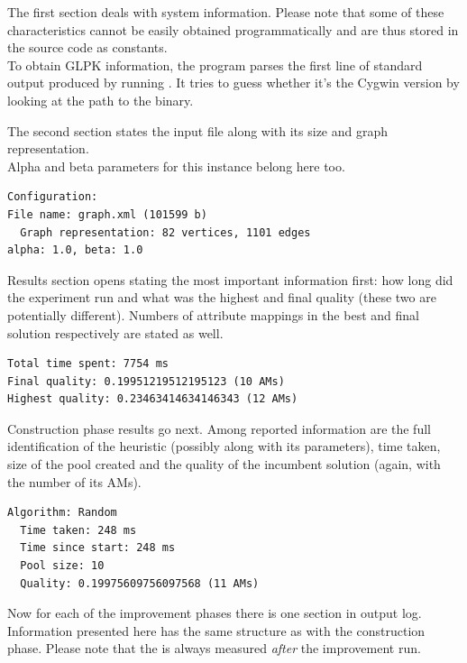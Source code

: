 \documentclass[a4paper,12pt,oneside]{report}
\newcommand{\code}[1]{\texttt{\StrSubstitute{#1}{.}{.\.}}}
\def\.{\discretionary{}{}{}}
\begin{document}
The first section deals with system information. Please note that some of these characteristics cannot be easily obtained programmatically and are thus stored in the source code as constants.\\
To obtain GLPK information, the program parses the first line of standard output produced by running \code{glpsol -v}. It tries to guess whether it's the Cygwin version by looking at the path to the binary.

The second section states the input file along with its size and graph representation.\\
Alpha and beta parameters for this instance belong here too.

\begin{footnotesize}
\begin{verbatim}
Configuration:
File name: graph.xml (101599 b)
  Graph representation: 82 vertices, 1101 edges
alpha: 1.0, beta: 1.0
\end{verbatim}
\end{footnotesize}

Results section opens stating the most important information first: how long did the experiment run and what was the highest and final quality (these two are potentially different). Numbers of attribute mappings in the best and final solution respectively are stated as well.

\begin{footnotesize}
\begin{verbatim}
Total time spent: 7754 ms
Final quality: 0.19951219512195123 (10 AMs)
Highest quality: 0.23463414634146343 (12 AMs)
\end{verbatim}
\end{footnotesize}

Construction phase results go next. Among reported information are the full identification of the heuristic (possibly along with its parameters), time taken, size of the pool created and the quality of the incumbent solution (again, with the number of its AMs).

\begin{footnotesize}
\begin{verbatim}
Algorithm: Random
  Time taken: 248 ms
  Time since start: 248 ms
  Pool size: 10
  Quality: 0.19975609756097568 (11 AMs)
\end{verbatim}
\end{footnotesize}

Now for each of the improvement phases there is one section in output log. Information presented here has the same structure as with the construction phase. Please note that the \code{Pool size} is always measured \textit{after} the improvement run.
\end{document}

